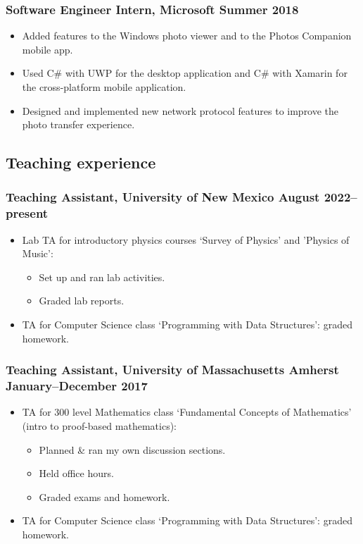 \documentclass{article}
\begin{document}
		\subsubsection*{Software Engineer Intern, Microsoft \hfill \normalfont \normalsize Summer 2018}
		\begin{itemize}
			\item Added features to the Windows photo viewer and to the Photos Companion mobile app.
			\item Used C\# with UWP for the desktop application and C\# with Xamarin for the cross-platform mobile application.
			\item Designed and implemented new network protocol features to improve the photo transfer experience.
		\end{itemize}
	
	\subsection*{Teaching experience}
		\subsubsection*{Teaching Assistant, University of New Mexico \hfill \normalfont \normalsize August 2022--present}
		\begin{itemize}
			\item Lab TA for introductory physics courses `Survey of Physics' and 'Physics of Music':
			\begin{itemize}
				\item Set up and ran lab activities.
				\item Graded lab reports.
			\end{itemize}
			\item TA for Computer Science class `Programming with Data Structures': graded homework.
		\end{itemize}
		\subsubsection*{Teaching Assistant, University of Massachusetts Amherst \hfill \normalfont \normalsize January--December 2017}
			\begin{itemize}
			\item TA for 300 level Mathematics class `Fundamental Concepts of Mathematics' (intro to proof-based mathematics):
			\begin{itemize}
				\item Planned \& ran my own discussion sections.
				\item Held office hours.
				\item Graded exams and homework.
			\end{itemize}
			\item TA for Computer Science class `Programming with Data Structures': graded homework.
			\end{itemize}
\end{document}
